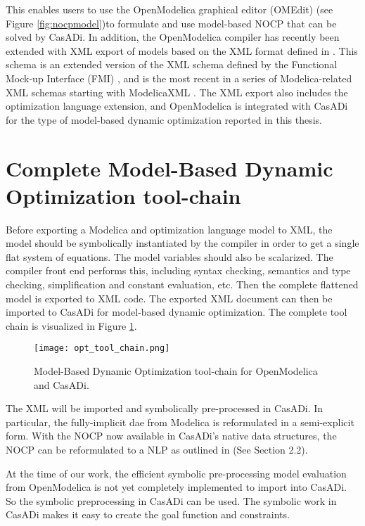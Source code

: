 This enables users to use the OpenModelica graphical editor (OMEdit) (see Figure \ref{fig:nocpmodel})to formulate and use model-based NOCP that can be solved by CasADi.
In addition, the OpenModelica compiler has recently been extended with XML export of models \cite{alachew} based on the XML
format defined in \cite{xml}. This schema is an extended version of the XML schema
defined by the Functional Mock-up Interface (FMI) \cite{fmi}, and is the most recent in a series of
Modelica-related XML schemas starting with ModelicaXML \cite{pop}. The XML export also includes the
optimization language extension, and OpenModelica is integrated with CasADi for the type of model-based dynamic optimization reported in this thesis.

\section{Complete Model-Based Dynamic Optimization tool-chain}
\label{sec:optimizationtoolchain}

Before exporting a Modelica and optimization language model to XML, the model should be symbolically
instantiated by the compiler in order to get a single flat system of equations. The model variables should also be
scalarized. The compiler front end performs this, including syntax checking, semantics and type checking, simplification
and constant evaluation, etc. Then the complete flattened model is exported to XML code. The exported
XML document can then be imported to CasADi for model-based dynamic optimization. The complete tool chain is
visualized in Figure \ref{fig:optimizationtoolchain}.


\begin{figure} [!h]
	\texttt{[image: opt\_tool\_chain.png]}
	\caption{Model-Based Dynamic Optimization tool-chain for OpenModelica and CasADi.}
	\label{fig:optimizationtoolchain}
\end{figure}

The XML will be imported and symbolically pre-processed in CasADi. In particular, the fully-implicit \acrshort{dae} from
Modelica is reformulated in a semi-explicit form. With the NOCP now available in CasADi’s native data structures, the
NOCP can be reformulated to a NLP as outlined in \cite{alachewoptimization} (See Section 2.2).

At the time of our work, the efficient symbolic pre-processing model evaluation from OpenModelica is not yet completely
implemented to import into CasADi. So the symbolic preprocessing in CasADi can be used. The symbolic work in CasADi makes it easy to create the goal function and constraints.

